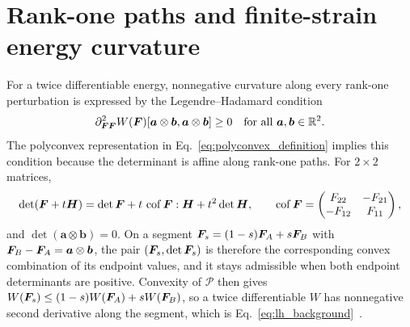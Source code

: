 \section{Rank-one paths and finite-strain energy curvature}
\label{app:finite_strain_curvature}
For a twice differentiable energy, nonnegative curvature along every rank-one perturbation is expressed by the Legendre--Hadamard condition
\begin{equation}
 \partial^2_{\bm F\bm F}W(\bm F)[\bm a\otimes\bm b,\bm a\otimes\bm b]\geq0
 \quad\hbox{for all }\bm a,\bm b\in\mathbb R^2 .
 \label{eq:lh_background}
\end{equation}
The polyconvex representation in Eq.~\eqref{eq:polyconvex_definition} implies this condition because the determinant is affine along rank-one paths. For $2\times2$ matrices,
\begin{equation}
 \det(\bm F+t\bm H)=\det\bm F+t\,\operatorname{cof}\bm F:\bm H+t^2\det\bm H,
 \qquad
 \operatorname{cof}\bm F=\begin{pmatrix}F_{22}&-F_{21}\\-F_{12}&F_{11}\end{pmatrix},
 \label{eq:rankone_minor_line}
\end{equation}
and $\det(\bm a\otimes\bm b)=0$. On a segment $\bm F_s=(1-s)\bm F_A+s\bm F_B$ with $\bm F_B-\bm F_A=\bm a\otimes\bm b$, the pair $(\bm F_s,\det\bm F_s)$ is therefore the corresponding convex combination of its endpoint values, and it stays admissible when both endpoint determinants are positive. Convexity of $\mathcal P$ then gives $W(\bm F_s)\leq(1-s)W(\bm F_A)+sW(\bm F_B)$, so a twice differentiable $W$ has nonnegative second derivative along the segment, which is Eq.~\eqref{eq:lh_background}~\cite{ball1977,Ciarlet1988}.

